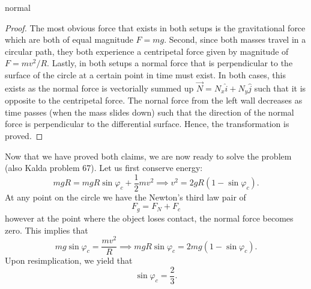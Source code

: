 \begin{solution}{normal}
\begin{proof}
\noindent The most obvious force that exists in both setups is the gravitational force which are both of equal magnitude $F = mg$. Second, since both masses travel in a circular path, they both experience a centripetal force given by magnitude of $F = mv^2/R$. Lastly, in both setups a normal force that is perpendicular to the surface of the circle at a certain point in time must exist. In both cases, this exists as the normal force is vectorially summed up $\vec{N} = N_x\hat{i} + N_y\hat{j}$ such that it is opposite to the centripetal force. The nornal force from the left wall decreases as time passes (when the mass slides down) such that the direction of the normal force is perpendicular to the differential surface. Hence, the transformation is proved.
\end{proof}
Now that we have proved both claims, we are now ready to solve the problem (also Kalda problem 67). Let us first conserve energy:
\[mgR = mgR\sin\varphi_c + \frac{1}{2}mv^2\implies v^2 = 2gR (1 - \sin\varphi_c).\]
At any point on the circle we have the Newton’s third law pair of
\[F_g = F_N + F_c\]
however at the point where the object loses contact, the normal force becomes zero. This implies that
\[mg\sin\varphi_c = \frac{mv^2}{R} \implies mgR\sin\varphi_c = 2mg(1 - \sin\varphi_c).\]
Upon resimplication, we yield that 
\[\sin\varphi_c = \frac{2}{3}.\]
\end{solution}
